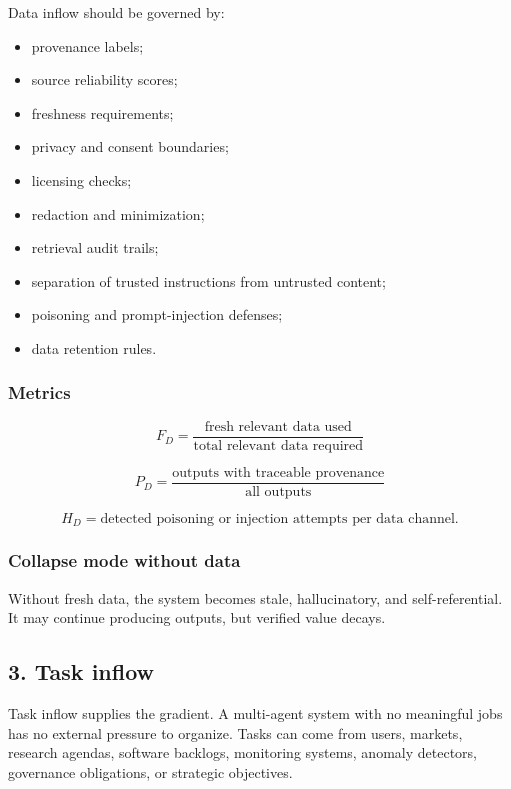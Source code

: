 \documentclass[11pt]{article}
\providecommand{\tightlist}{\setlength{\itemsep}{0pt}\setlength{\parskip}{0pt}}
\begin{document}
Data inflow should be governed by:

\begin{itemize}
\tightlist
\item
  provenance labels;
\item
  source reliability scores;
\item
  freshness requirements;
\item
  privacy and consent boundaries;
\item
  licensing checks;
\item
  redaction and minimization;
\item
  retrieval audit trails;
\item
  separation of trusted instructions from untrusted content;
\item
  poisoning and prompt-injection defenses;
\item
  data retention rules.
\end{itemize}

\subsubsection{Metrics}\label{metrics-1}

\[
F_D=\frac{\text{fresh relevant data used}}{\text{total relevant data required}}
\]

\[
P_D=\frac{\text{outputs with traceable provenance}}{\text{all outputs}}
\]

\[
H_D=\text{detected poisoning or injection attempts per data channel}.
\]

\subsubsection{Collapse mode without
data}\label{collapse-mode-without-data}

Without fresh data, the system becomes stale, hallucinatory, and
self-referential. It may continue producing outputs, but verified value
decays.

\subsection{3. Task inflow}\label{task-inflow}

Task inflow supplies the gradient. A multi-agent system with no
meaningful jobs has no external pressure to organize. Tasks can come
from users, markets, research agendas, software backlogs, monitoring
systems, anomaly detectors, governance obligations, or strategic
objectives.
\end{document}
